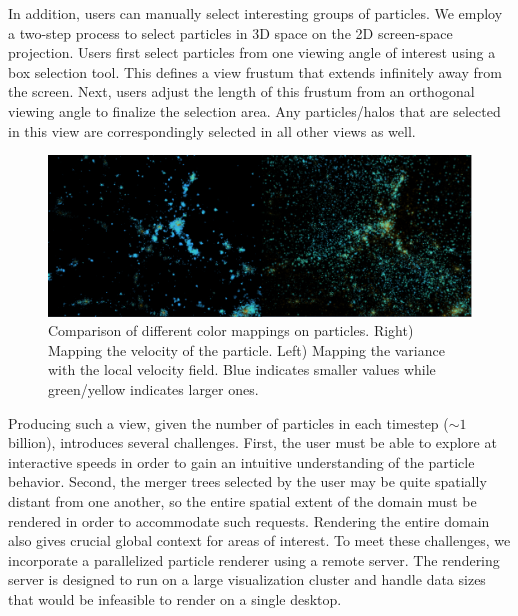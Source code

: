 In addition, users can manually select interesting groups of particles. We employ a two-step process to select particles in 3D space on the 2D screen-space projection. Users first select particles from one viewing angle of interest using a box selection tool. This defines a view frustum that extends infinitely away from the screen. Next, users adjust the length of this frustum from an orthogonal viewing angle to finalize the selection area. Any particles/halos that are selected in this view are correspondingly selected in all other views as well.

	
	\begin{figure}[t]
		\includegraphics[width=\textwidth]{images/darkmatter/variance_comparison.png}
		\caption{Comparison of different color mappings on particles. Right) Mapping the velocity of the particle. Left) Mapping the variance with the local velocity field. Blue indicates smaller values while green/yellow indicates larger ones.}
		\label{fig:variance_comparison}
	\end{figure}
	
Producing such a view, given the number of particles in each timestep ($\sim 1$ billion), introduces several challenges. First, the user must be able to explore at interactive speeds in order to gain an intuitive understanding of the particle behavior. Second, the merger trees selected by the user may be quite spatially distant from one another, so the entire spatial extent of the domain must be rendered in order to accommodate such requests. Rendering the entire domain also gives crucial global context for areas of interest. To meet these challenges, we incorporate a parallelized particle renderer using a remote server. The rendering server is designed to run on a large visualization cluster and handle data sizes that would be infeasible to render on a single desktop.

